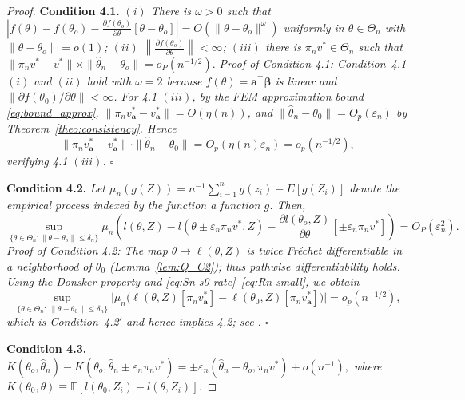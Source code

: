 \documentclass[11pt]{article}
\newenvironment{condition}[1]
  {\par\medskip\noindent\textbf{Condition #1.}\itshape}
  {\medskip}
\begin{document}
\begin{proof}
		\begin{condition}{4.1} $(i)$ There is $\omega > 0$ such that  
			\(
			| f(\theta) - f(\theta_o) - \frac{\partial f(\theta_o)}{\partial \theta}[\theta - \theta_o] | = O(\|\theta - \theta_o\|^\omega)
			\)
			uniformly in $\theta \in \Theta_n$ with $\|\theta - \theta_o\| = o(1)$; $(ii)$ $\left\| \frac{\partial f(\theta_o)}{\partial \theta} \right\| < \infty$; $(iii)$ there is $\pi_n v^* \in \Theta_n$ such that  
			\(
			\|\pi_n v^* - v^*\| \times \|\hat{\theta}_n - \theta_o\| = o_P(n^{-1/2}).
			\)
		\end{condition}
		\noindent\textit{Proof of Condition 4.1}: Condition~4.1 $(i)$ and $(ii)$ hold with $\omega=2$ because $f(\theta)=\bm a^\top\bm\beta$ is linear and $\big\|\partial f(\theta_0)/\partial\theta\big\|<\infty$. For 4.1 $(iii)$, by the FEM approximation bound \eqref{eq:bound_approx},
		$\|\pi_n v_{\bm a}^*-v_{\bm a}^*\|=O(\eta(n))$, and $\|\hat\theta_n-\theta_0\|=O_p(\varepsilon_n)$ by Theorem~\ref{theo:consistency}. Hence
		\[
		\|\pi_n v_{\bm a}^*-v_{\bm a}^*\|\cdot \|\hat\theta_n-\theta_0\|
		=O_p(\eta(n)\varepsilon_n)=o_p(n^{-1/2}),
		\]
		verifying 4.1 $(iii)$. \hfill $\square$
		
		\begin{condition}{4.2} Let $\mu_n(g(Z)) = n^{-1}\sum_{i=1}^n g(z_i) - E[g(Z_i)]$ denote the empirical process indexed by the function a function $g$. Then, 
		\[
		\sup_{\{\theta \in \Theta_n : \|\theta - \theta_o\| \le \delta_n\}}  
		\mu_n \left( l(\theta, Z) - l(\theta \pm \varepsilon_n \pi_n v^*, Z) - \frac{\partial l(\theta_o, Z)}{\partial \theta} [\pm \varepsilon_n \pi_n v^*] \right)  
		= O_P(\varepsilon_n^2).
		\]
		\end{condition}
		\noindent\textit{Proof of Condition 4.2}: The map $\theta\mapsto\ell(\theta,Z)$ is twice Fréchet differentiable in a neighborhood of $\theta_0$ (Lemma~\ref{lem:Q_C2}); thus pathwise differentiability holds. Using the Donsker property and \eqref{eq:Sn-s0-rate}--\eqref{eq:Rn-small}, we obtain
		\[
		\sup_{\{\theta\in\Theta_n:\ \|\theta-\theta_0\|\le \delta_n\}}
		\Big|\mu_n\big(\dot\ell(\theta,Z)[\pi_n v_{\bm a}^*]-\dot\ell(\theta_0,Z)[\pi_n v_{\bm a}^*]\big)\Big|
		=o_p(n^{-1/2}),
		\]
		which is Condition~4.2$'$ and hence implies 4.2; see \cite{chen2007large}. \hfill $\square$
		
		
		\begin{condition}{4.3}
		\(
		K(\theta_o, \hat{\theta}_n) - K(\theta_o, \hat{\theta}_n \pm \varepsilon_n \pi_n v^*)  
		= \pm \varepsilon_n (\hat{\theta}_n - \theta_o, \pi_n v^*) + o(n^{-1}),
		\)
		where $K(\theta_{0}, \theta) \equiv \mathbb{E}[l(\theta_0, Z_i) - l(\theta, Z_i)]$.
        \end{condition}
	

\end{proof}
\end{document}
